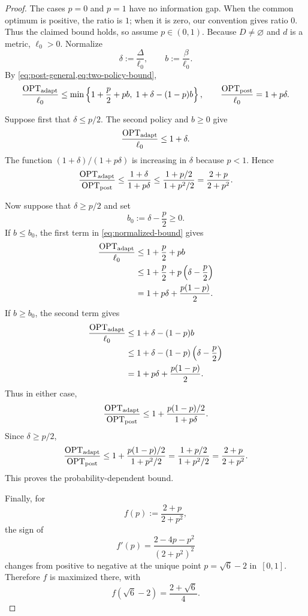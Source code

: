 \documentclass[12pt,a4paper,oneside]{report}
\begin{document}
\begin{proof}
The cases $p=0$ and $p=1$ have no information gap.  When the common
optimum is positive, the ratio is $1$; when it is zero, our convention gives
ratio $0$.  Thus the claimed bound holds, so assume $p\in(0,1)$.  Because
$D\ne\varnothing$ and $d$ is a metric, $\ell_0>0$.  Normalize
\[
  \delta:=\frac{\Delta}{\ell_0},
  \qquad
  b:=\frac{\beta}{\ell_0}.
\]
By \cref{eq:post-general,eq:two-policy-bound},
\begin{equation}\label{eq:normalized-bound}
  \frac{\operatorname{OPT}_\mathrm{adapt}}{\ell_0}
  \le
  \min\left\{
    1+\frac p2+pb,
    \;1+\delta-(1-p)b
  \right\},
  \qquad
  \frac{\operatorname{OPT}_\mathrm{post}}{\ell_0}=1+p\delta.
\end{equation}

Suppose first that $\delta\le p/2$.  The second policy and $b\ge0$ give
\[
  \frac{\operatorname{OPT}_\mathrm{adapt}}{\ell_0}\le1+\delta.
\]
The function $(1+\delta)/(1+p\delta)$ is increasing in $\delta$ because
$p<1$.  Hence
\[
  \frac{\operatorname{OPT}_\mathrm{adapt}}{\operatorname{OPT}_\mathrm{post}}
  \le\frac{1+\delta}{1+p\delta}
  \le\frac{1+p/2}{1+p^2/2}
  =\frac{2+p}{2+p^2}.
\]

Now suppose that $\delta\ge p/2$ and set
\[
  b_0:=\delta-\frac p2\ge0.
\]
If $b\le b_0$, the first term in \cref{eq:normalized-bound} gives
\[
\begin{aligned}
  \frac{\operatorname{OPT}_\mathrm{adapt}}{\ell_0}
  &\le1+\frac p2+pb\\
  &\le1+\frac p2+p\left(\delta-\frac p2\right)\\
  &=1+p\delta+\frac{p(1-p)}2.
\end{aligned}
\]
If $b\ge b_0$, the second term gives
\[
\begin{aligned}
  \frac{\operatorname{OPT}_\mathrm{adapt}}{\ell_0}
  &\le1+\delta-(1-p)b\\
  &\le1+\delta-(1-p)\left(\delta-\frac p2\right)\\
  &=1+p\delta+\frac{p(1-p)}2.
\end{aligned}
\]
Thus in either case,
\[
  \frac{\operatorname{OPT}_\mathrm{adapt}}{\operatorname{OPT}_\mathrm{post}}
  \le
  1+\frac{p(1-p)/2}{1+p\delta}.
\]
Since $\delta\ge p/2$,
\[
  \frac{\operatorname{OPT}_\mathrm{adapt}}{\operatorname{OPT}_\mathrm{post}}
  \le
  1+\frac{p(1-p)/2}{1+p^2/2}
  =\frac{1+p/2}{1+p^2/2}
  =\frac{2+p}{2+p^2}.
\]
This proves the probability-dependent bound.

Finally, for
\[
  f(p):=\frac{2+p}{2+p^2},
\]
the sign of
\[
  f'(p)=\frac{2-4p-p^2}{(2+p^2)^2}
\]
changes from positive to negative at the unique point
$p=\sqrt6-2$ in~$[0,1]$.  Therefore $f$ is maximized there, with
\[
  f(\sqrt6-2)=\frac{2+\sqrt6}{4}.
\]
\end{proof}
\end{document}
